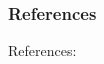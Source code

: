 \begin{frame}
  \frametitle{References}
  \begin{module}[id=references]
  References:
  \end{module}
\end{frame}